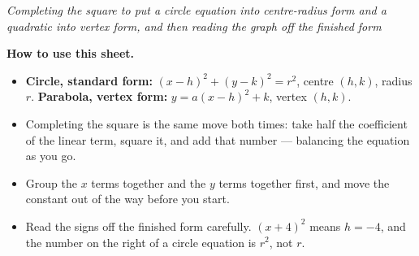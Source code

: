 \documentclass[12pt]{article}
\begin{document}

\begin{center}\small\textit{Completing the square to put a circle equation into centre-radius
form and a quadratic into vertex form, and then reading the graph off the finished
form}\end{center}

\noindent\small\textbf{How to use this sheet.}
\begin{itemize}[label={$\bullet$}, leftmargin=1.1cm, itemsep=1pt, topsep=2pt]
  \item \textbf{Circle, standard form:} $(x-h)^2 + (y-k)^2 = r^2$, centre $(h,k)$, radius $r$.
        \textbf{Parabola, vertex form:} $y = a(x-h)^2 + k$, vertex $(h,k)$.
  \item Completing the square is the same move both times: take half the coefficient of the
        linear term, square it, and add that number --- balancing the equation as you go.
  \item Group the $x$ terms together and the $y$ terms together first, and move the constant
        out of the way before you start.
  \item Read the signs off the finished form carefully. $(x+4)^2$ means $h = -4$, and the
        number on the right of a circle equation is $r^2$, not $r$.
\end{itemize}
\normalsize

\bigskip


\end{document}
